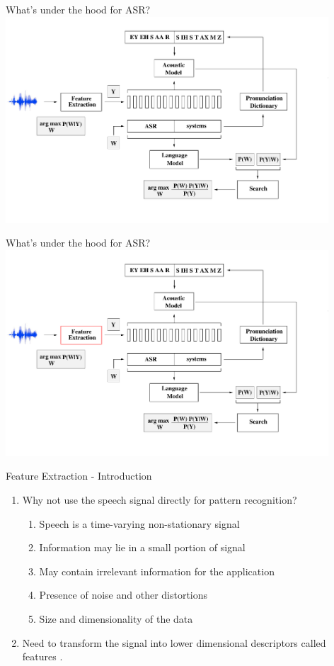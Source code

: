 \begin{frame}{What's under the hood for ASR?}
\includegraphics[height=77mm]{figures/ASR9}
\end{frame}

\begin{frame}{What's under the hood for ASR?}
\includegraphics[height=77mm]{figures/b1}
\end{frame}

\begin{frame}{Feature Extraction - Introduction}
\begin{enumerate}
\item Why not use the speech signal directly for pattern recognition?
\begin{enumerate}
\item Speech is a \alert{time-varying non-stationary signal}
\item Information may lie in a \alert{small portion} of signal
\item May contain \alert{irrelevant information} for the application
\item Presence of \alert{noise and other distortions}
\item \alert{Size and dimensionality} of the data
\end{enumerate}
\item Need to transform the signal into lower dimensional descriptors called \alert{features} \cite{li2014overview,o2013acoustic}.
\end{enumerate}
\end{frame}


